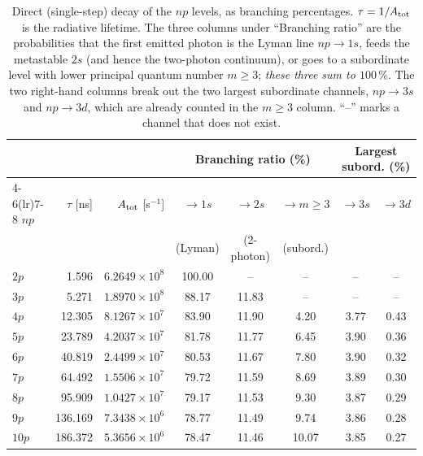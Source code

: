 \documentclass[english,a4paper]{my_memo}
\begin{document}
\begin{table}[htb]
\centering
\caption{Direct (single-step) decay of the $np$ levels, as branching
percentages.  $\tau = 1/A_{\rm tot}$ is the radiative lifetime.  The three
columns under ``Branching ratio'' are the probabilities that the first
emitted photon is the Lyman line $np \to 1s$, feeds the metastable $2s$
(and hence the two-photon continuum), or goes to a subordinate level with
lower principal quantum number $m \ge 3$; \emph{these three sum to
$100\,\%$}.  The two right-hand columns break out the two largest
subordinate channels, $np \to 3s$ and $np \to 3d$, which are already counted
in the $m \ge 3$ column.  ``--'' marks a channel that does not exist.}
\label{tab:branch}
\footnotesize
\setlength{\tabcolsep}{5pt}
\begin{tabular}{l r r c c c c c}
\toprule
      &            &                      & \multicolumn{3}{c}{Branching ratio (\%)} & \multicolumn{2}{c}{Largest subord. (\%)} \\
\cmidrule(lr){4-6}\cmidrule(lr){7-8}
$np$  & $\tau$ [ns] & $A_{\rm tot}$ [s$^{-1}$] & $\to 1s$ & $\to 2s$ & $\to m\!\ge\!3$ & $\to 3s$ & $\to 3d$ \\
      &            &                      & (Lyman)  & (2-photon) & (subord.)     &          &          \\
\midrule
$2p$  & 1.596   & $6.2649 \times 10^{8}$ & 100.00 & --    & --    & --   & --   \\
$3p$  & 5.271   & $1.8970 \times 10^{8}$ & 88.17  & 11.83 & --    & --   & --   \\
$4p$  & 12.305  & $8.1267 \times 10^{7}$ & 83.90  & 11.90 & 4.20  & 3.77 & 0.43 \\
$5p$  & 23.789  & $4.2037 \times 10^{7}$ & 81.78  & 11.77 & 6.45  & 3.90 & 0.36 \\
$6p$  & 40.819  & $2.4499 \times 10^{7}$ & 80.53  & 11.67 & 7.80  & 3.90 & 0.32 \\
$7p$  & 64.492  & $1.5506 \times 10^{7}$ & 79.72  & 11.59 & 8.69  & 3.89 & 0.30 \\
$8p$  & 95.909  & $1.0427 \times 10^{7}$ & 79.17  & 11.53 & 9.30  & 3.87 & 0.29 \\
$9p$  & 136.169 & $7.3438 \times 10^{6}$ & 78.77  & 11.49 & 9.74  & 3.86 & 0.28 \\
$10p$ & 186.372 & $5.3656 \times 10^{6}$ & 78.47  & 11.46 & 10.07 & 3.85 & 0.27 \\
\bottomrule
\end{tabular}
\end{table}
\end{document}
